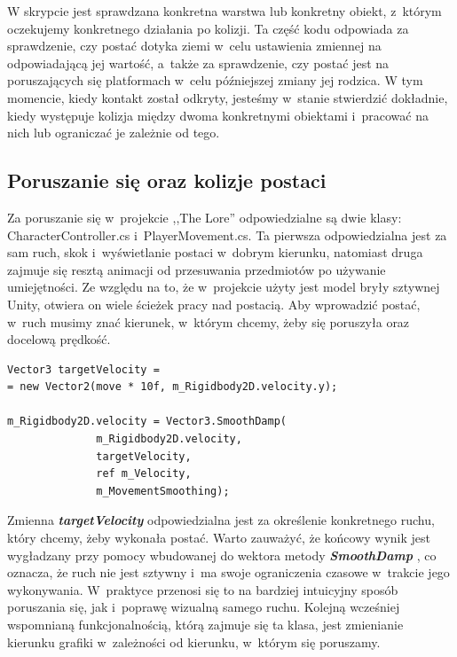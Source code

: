 \documentclass[oneside,polski,logo]{amuthesis}
\begin{document}
W skrypcie jest sprawdzana konkretna warstwa lub konkretny obiekt, z~którym oczekujemy konkretnego działania po kolizji.
Ta część kodu odpowiada za sprawdzenie, czy postać dotyka ziemi w~celu ustawienia zmiennej na odpowiadającą jej wartość, a~także za sprawdzenie, czy postać jest na poruszających się platformach w~celu późniejszej zmiany jej rodzica.
W tym momencie, kiedy kontakt został odkryty, jesteśmy w~stanie stwierdzić dokładnie, kiedy występuje kolizja między dwoma konkretnymi obiektami i~pracować na nich lub ograniczać je zależnie od tego.

\subsection{Poruszanie się oraz kolizje postaci}
Za poruszanie się w~projekcie ,,The Lore'' odpowiedzialne są dwie klasy: CharacterController.cs i~PlayerMovement.cs. Ta pierwsza odpowiedzialna jest za sam ruch, skok i~wyświetlanie postaci w~dobrym kierunku, natomiast druga zajmuje się resztą animacji od przesuwania przedmiotów po używanie umiejętności. Ze względu na to, że w~projekcie użyty jest model bryły sztywnej Unity, otwiera on wiele ścieżek pracy nad postacią. Aby wprowadzić postać, w~ruch musimy znać kierunek, w~którym chcemy, żeby się poruszyła oraz docelową prędkość.


\begin{lstlisting}[breaklines=true,
language={[Sharp]C},
rulecolor=\color{blue!80!black},
caption={Fragment klasy \texttt{CharacterController.cs}}
]
Vector3 targetVelocity =
= new Vector2(move * 10f, m_Rigidbody2D.velocity.y);

m_Rigidbody2D.velocity = Vector3.SmoothDamp(
              m_Rigidbody2D.velocity, 
              targetVelocity, 
              ref m_Velocity, 
              m_MovementSmoothing);
\end{lstlisting}

Zmienna \textbf{\textit{targetVelocity}} odpowiedzialna jest za określenie konkretnego ruchu, który chcemy, żeby wykonała postać. Warto zauważyć, że końcowy wynik jest wygładzany przy pomocy wbudowanej do wektora metody \textbf{\textit{SmoothDamp}} \cite{physics2}, co oznacza, że ruch nie jest sztywny i~ma swoje ograniczenia czasowe w~trakcie jego wykonywania. W~praktyce przenosi się to na bardziej intuicyjny sposób poruszania się, jak i~poprawę wizualną samego ruchu.
Kolejną wcześniej wspomnianą funkcjonalnością, którą zajmuje się ta klasa, jest zmienianie kierunku grafiki w~zależności od kierunku, w~którym się poruszamy.
\end{document}
